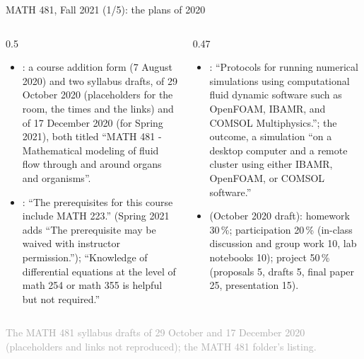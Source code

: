 \documentclass[aspectratio=169,11pt]{beamer}
\newcommand{\sourcecredit}[1]{\vfill\begin{flushright}\tiny\textcolor{DarkGray}{#1}\end{flushright}}
\begin{document}
\begin{frame}{MATH 481, Fall 2021 (1/5): the plans of 2020}
\label{fr:m481a}
\begin{columns}[T,onlytextwidth]
\begin{column}{0.5\textwidth}
\scriptsize
\begin{itemize}\setlength{\itemsep}{3pt}
  \item {}: a course addition form (7 August 2020) and two syllabus drafts, of 29 October 2020 (placeholders for the room, the times and the links) and of 17 December 2020 (for Spring 2021), both titled ``MATH 481 - Mathematical modeling of fluid flow through and around organs and organisms''.
  \item {}: ``The prerequisites for this course include MATH 223.'' (Spring 2021 adds ``The prerequisite may be waived with instructor permission.''); ``Knowledge of differential equations at the level of math 254 or math 355 is helpful but not required.''
\end{itemize}
\end{column}
\begin{column}{0.47\textwidth}
\scriptsize
\begin{itemize}\setlength{\itemsep}{3pt}
  \item {}: ``Protocols for running numerical simulations using computational fluid dynamic software such as OpenFOAM, IBAMR, and COMSOL Multiphysics.''; the outcome, a simulation ``on a desktop computer and a remote cluster using either IBAMR, OpenFOAM, or COMSOL software.''
  \item {} (October 2020 draft): homework 30\,\%; participation 20\,\% (in-class discussion and group work 10, lab notebooks 10); project 50\,\% (proposals 5, drafts 5, final paper 25, presentation 15).
\end{itemize}
\end{column}
\end{columns}
\sourcecredit{The MATH 481 syllabus drafts of 29 October and 17 December 2020 (placeholders and links not reproduced); the MATH 481 folder's listing.}
\end{frame}
\end{document}
